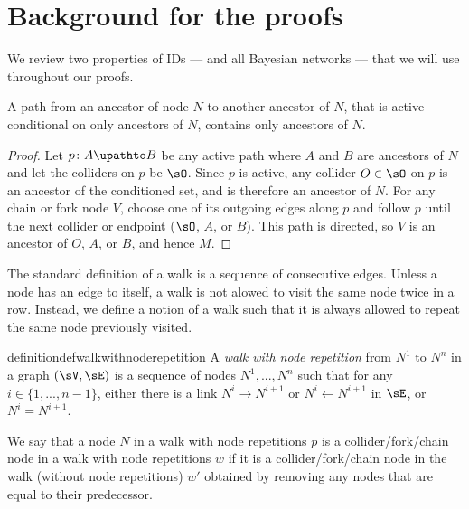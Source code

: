 






\section{Background for the proofs} \label{sec:background}
We review two properties of IDs --- and all Bayesian networks --- that we will use throughout our proofs.
\begin{lemma}
\label{le:2.12-active-paths-between-ancestors-contain-only-ancestors}
A path from an ancestor of node $N$ to another ancestor of $N$, that is active conditional on only ancestors of $N$, contains only ancestors of $N$.~
\end{lemma}
\begin{proof}
Let $p\colon  A \upathto B$ be any active path where $A$ and $B$ are ancestors of $N$ and let the colliders on $p$ be $\sO$.
Since $p$ is active, any collider $O \in \sO$ on $p$ is an ancestor of the conditioned set, and is therefore an ancestor of $N$.
For any chain or fork node $V$, choose one of its outgoing edges along $p$ and follow $p$ until the next collider or endpoint ($\sO$, $A$, or $B$).
This path is directed, so $V$ is an ancestor of $O$, $A$, or $B$, and hence $M$.
\end{proof}






The standard definition of a walk is a sequence of consecutive edges. 
Unless a node has an edge to itself, a walk is not alowed to visit the same node twice in a row.
Instead, we define a notion of a walk such that it is always allowed to repeat the same node previously visited.



\begin{restatable} {definition}{defwalkwithnoderepetition} \label{def:21feb17.1-walk-with-node-repetition}
A \emph{walk with node repetition} from $N^1$ to $N^n$ in a graph $(\sV, \sE)$ is a sequence of nodes $N^1,...,N^n$ such that for any $i\in \{1,...,n-1\}$, either there is a link $N^i\to N^{i+1}$ or $N^i\gets N^{i+1}$ in $\sE$, or $N^i=N^{i+1}$.
\end{restatable}

We say that a node $N$ in a walk with node repetitions $p$ is a collider/fork/chain node in a walk with node repetitions $w$ if it is a collider/fork/chain node in the walk (without node repetitions) $w'$ obtained by removing any nodes that are equal to their predecessor.

